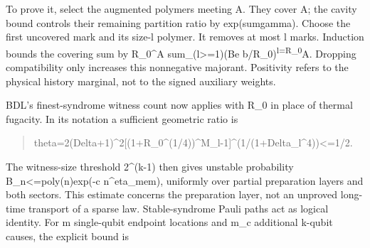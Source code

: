 \documentclass[
]{article}
\begin{document}
To prove it, select the augmented polymers meeting A. They cover A; the
cavity bound controls their remaining partition ratio by
exp(sum\textbar gamma\textbar). Choose the first uncovered mark and its
size-l polymer. It removes at most l marks. Induction bounds the
covering sum by R\_0\^{}\textbar A\textbar{} sum\_(l\textgreater=1)(Be
b/R\_0)\textsuperscript{l=R\_0}\textbar A\textbar. Dropping
compatibility only increases this nonnegative majorant. Positivity
refers to the physical history marginal, not to the signed auxiliary
weights.

BDL's finest-syndrome witness count now applies with R\_0 in place of
thermal fugacity. In its notation a sufficient geometric ratio is

\begin{quote}\small\ttfamily\raggedright\setlength{\parskip}{0pt}
\noindent t\allowbreak{}h\allowbreak{}e\allowbreak{}t\allowbreak{}a\allowbreak{}=\allowbreak{}2\allowbreak{}(\allowbreak{}D\allowbreak{}e\allowbreak{}l\allowbreak{}t\allowbreak{}a\allowbreak{}+\allowbreak{}1\allowbreak{})\allowbreak{}\^{}\allowbreak{}2\allowbreak{}[\allowbreak{}(\allowbreak{}1\allowbreak{}+\allowbreak{}R\allowbreak{}\_\allowbreak{}0\allowbreak{}\^{}\allowbreak{}(\allowbreak{}1\allowbreak{}/\allowbreak{}4\allowbreak{})\allowbreak{})\allowbreak{}\^{}\allowbreak{}M\allowbreak{}\_\allowbreak{}l\allowbreak{}-\allowbreak{}1\allowbreak{}]\allowbreak{}\^{}\allowbreak{}(\allowbreak{}1\allowbreak{}/\allowbreak{}(\allowbreak{}1\allowbreak{}+\allowbreak{}D\allowbreak{}e\allowbreak{}l\allowbreak{}t\allowbreak{}a\allowbreak{}\_\allowbreak{}l\allowbreak{}\^{}\allowbreak{}4\allowbreak{})\allowbreak{})\allowbreak{}<\allowbreak{}=\allowbreak{}1\allowbreak{}/\allowbreak{}2\allowbreak{}.\par
\end{quote}

The witness-size threshold 2\^{}(k-1) then gives unstable probability
B\allowbreak{}\_\allowbreak{}n\allowbreak{}<\allowbreak{}=\allowbreak{}p\allowbreak{}o\allowbreak{}l\allowbreak{}y\allowbreak{}(\allowbreak{}n\allowbreak{})\allowbreak{}e\allowbreak{}x\allowbreak{}p\allowbreak{}(\allowbreak{}-\allowbreak{}c
n\^{}eta\_mem), uniformly over partial preparation layers and both
sectors. This estimate concerns the preparation layer, not an unproved
long-time transport of a sparse law. Stable-syndrome Pauli paths act as
logical identity. For m single-qubit endpoint locations and m\_c
additional k-qubit causes, the explicit bound is
\end{document}
